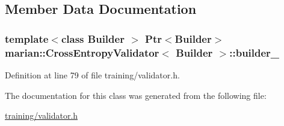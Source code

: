 \subsection{Member Data Documentation}
\subsubsection[{\texorpdfstring{builder\+\_\+}{builder_}}]{\setlength{\rightskip}{0pt plus 5cm}template$<$class Builder $>$ {\bf Ptr}$<$Builder$>$ {\bf marian\+::\+Cross\+Entropy\+Validator}$<$ Builder $>$\+::builder\+\_\+\hspace{0.3cm}{\ttfamily [private]}}\hypertarget{classmarian_1_1CrossEntropyValidator_ab714cc2a2867a2eee8507627b52940c6}{}\label{classmarian_1_1CrossEntropyValidator_ab714cc2a2867a2eee8507627b52940c6}


Definition at line 79 of file training/validator.\+h.



The documentation for this class was generated from the following file\+:\begin{DoxyCompactItemize}
\item 
\hyperlink{training_2validator_8h}{training/validator.\+h}\end{DoxyCompactItemize}
